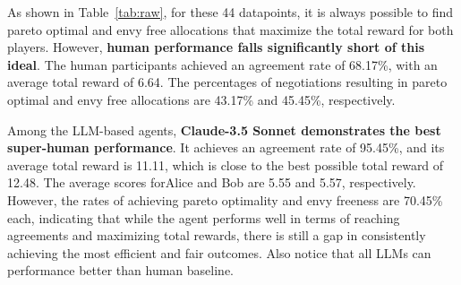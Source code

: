 \begin{table}[!ht]
    \centering
    \captionsetup{aboveskip=5pt}
    \caption{Raw-LLM vs. Raw-LLM}
    \label{tab:raw}
\end{table}

As shown in Table~\ref{tab:raw}, for these 44 datapoints, it is always possible to find pareto optimal and envy free allocations that maximize the total reward for both players. However, \textbf{human performance falls significantly short of this ideal}. The human participants achieved an agreement rate of 68.17\%, with an average total reward of 6.64. The percentages of negotiations resulting in pareto optimal and envy free allocations are 43.17\% and 45.45\%, respectively.

Among the LLM-based agents, \textbf{Claude-3.5 Sonnet demonstrates the best super-human performance}. It achieves an agreement rate of 95.45\%, and its average total reward is 11.11, which is close to the best possible total reward of 12.48. The average scores forAlice and Bob are 5.55 and 5.57, respectively. However, the rates of achieving pareto optimality and envy freeness are 70.45\% each, indicating that while the agent performs well in terms of reaching agreements and maximizing total rewards, there is still a gap in consistently achieving the most efficient and fair outcomes. Also notice that all LLMs can performance better than human baseline.

